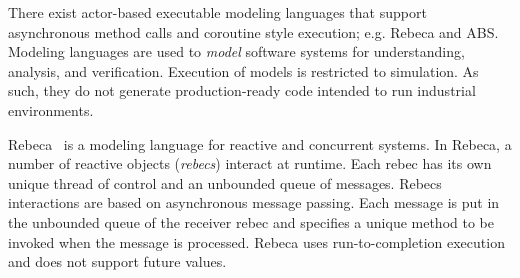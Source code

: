 
There exist actor-based executable modeling languages that support asynchronous method calls and coroutine style execution; e.g. Rebeca and ABS.
Modeling languages are used to \emph{model} software systems for understanding, analysis, and verification. 
Execution of models is restricted to simulation.
As such, they do not generate production-ready code intended to run industrial environments.

Rebeca~\cite{sirjani2002simulation,sirjani2004formal,sirjani2007rebeca} is a modeling language for reactive and concurrent systems. 
In Rebeca, a number of reactive objects (\emph{rebecs}) interact at runtime.
Each rebec has its own unique thread of control and an unbounded queue of messages.
Rebecs interactions are based on asynchronous message passing.
Each message is put in the unbounded queue of the
receiver rebec and specifies a unique method to be invoked when the message
is processed.
Rebeca uses run-to-completion execution and does not support future values.

